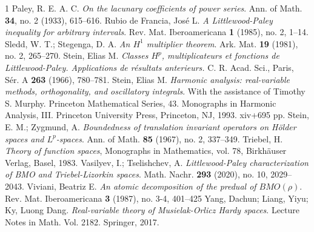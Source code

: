 \documentclass[a4paper, leqno, 10pt]{amsart}
\numberwithin{equation}{section}
\begin{document}
\begin{thebibliography}{1}
%
 Paley, R. E. A. C. {\it On the lacunary coefficients of power series}. Ann. of Math. {\bf 34}, no. 2 (1933), 615--616.
%
 Rubio de Francia, Jos\'e L. {\it A Littlewood-Paley inequality for arbitrary intervals}. Rev. Mat. Iberoamericana {\bf 1} (1985), no. 2, 1--14. 
%
 Sledd, W. T.; Stegenga, D. A. {\it  An $H^1$ multiplier theorem}. Ark. Mat. {\bf 19} (1981), no. 2, 265--270. 
%
 Stein, Elias M. {\it Classes $H^p$, multiplicateurs et fonctions de Littlewood-Paley. Applications de r\'esultats anterieurs.} 
C. R. Acad. Sci., Paris, S\'er. A {\bf 263} (1966), 780--781.
%
 Stein, Elias M. {\it Harmonic analysis: real-variable methods, orthogonality, and oscillatory integrals}. With the assistance of Timothy S. Murphy. Princeton Mathematical Series, 43. Monographs in Harmonic Analysis, III. Princeton University Press, Princeton, NJ, 1993. xiv+695 pp.
%
 Stein, E. M.; Zygmund, A. {\it Boundedness of translation invariant operators on H\"{o}lder spaces and $L^p$-spaces}. Ann. of Math. {\bf 85} (1967), no. 2,  337--349. 
%
 Triebel, H.  {\it Theory of function spaces}, Monographs in Mathematics, vol. 78, Birkh\"{a}user Verlag, Basel, 1983.
%
 Vasilyev, I.; Tselishchev, A. {\it Littlewood-Paley characterization of BMO and Triebel-Lizorkin spaces}. Math. Nachr. {\bf 293} (2020), no. 10, 2029--2043. 
%
 Viviani, Beatriz E. {\it An atomic decomposition of the predual of $BMO(\rho)$}. Rev. Mat. Iberoamericana {\bf 3} (1987), no. 3-4, 401--425
%
 Yang, Dachun; Liang, Yiyu; Ky, Luong Dang. {\it Real-variable theory of Musielak-Orlicz Hardy spaces}. Lecture Notes in Math. Vol. 2182. Springer, 2017.
%
\end{thebibliography}
%
\end{document}
